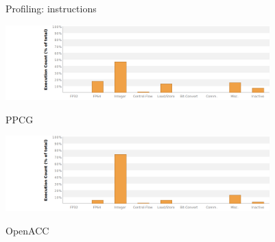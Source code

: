 \documentclass[aspectratio=169]{beamer}
\begin{document}
\begin{frame}[fragile]{Profiling: instructions}
\vskip10pt
\begin{minipage}{10cm}
\includegraphics[height=2.9cm]{figures/ppcg_instructions}
\end{minipage}%
\begin{minipage}{2cm}
\hskip2cm
\end{minipage}%
\begin{minipage}{1cm}
{\footnotesize PPCG}
\end{minipage}
\vskip15pt
\begin{minipage}{10cm}
\includegraphics[height=2.9cm]{figures/openacc_instructions}
\end{minipage}%
\begin{minipage}{2cm}
\hskip2cm
\end{minipage}%
\begin{minipage}{1cm}
{\footnotesize OpenACC}
\end{minipage}

\end{frame}
\end{document}
